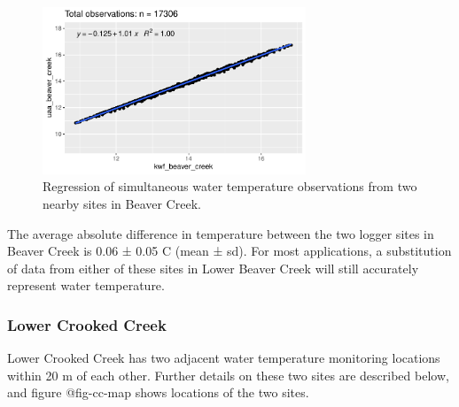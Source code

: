 \documentclass[
  letterpaper,
  DIV=11,
  numbers=noendperiod]{scrreprt}
\begin{document}
\begin{figure}

{\centering \includegraphics[width=0.7\textwidth,height=0.7\textheight]{./temp_logger_data_prep_files/figure-pdf/fig-bc-reg-1.pdf}

}

\caption{\label{fig-bc-reg}Regression of simultaneous water temperature
observations from two nearby sites in Beaver Creek.}

\end{figure}

The average absolute difference in temperature between the two logger
sites in Beaver Creek is 0.06 ± 0.05 C (mean ± sd). For most
applications, a substitution of data from either of these sites in Lower
Beaver Creek will still accurately represent water temperature.

\hypertarget{lower-crooked-creek}{%
\subsubsection{Lower Crooked Creek}\label{lower-crooked-creek}}

Lower Crooked Creek has two adjacent water temperature monitoring
locations within 20 m of each other. Further details on these two sites
are described below, and figure @fig-cc-map shows locations of the two
sites.
\end{document}
